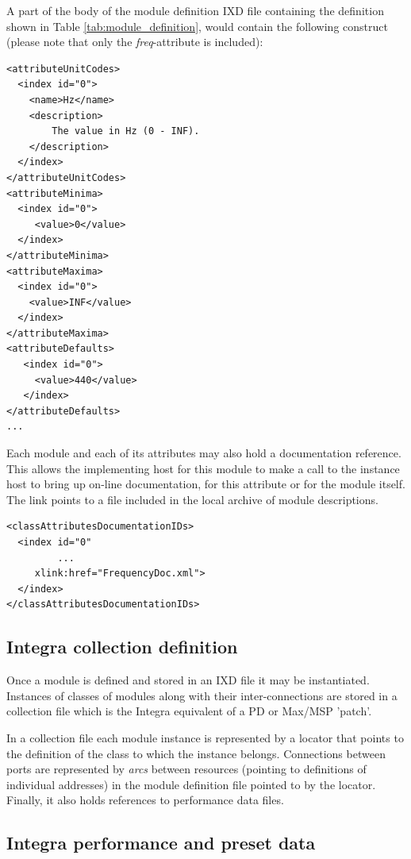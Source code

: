 \documentclass{article}
\begin{document}
A part of the body of the module definition IXD file containing the definition shown in Table \ref{tab:module_definition}, would contain the following construct (please note that only the \emph{freq}-attribute is included):

{\small
\begin{verbatim}
<attributeUnitCodes> 
  <index id="0">
    <name>Hz</name>
    <description>
        The value in Hz (0 - INF).
    </description>
  </index>
</attributeUnitCodes>
<attributeMinima> 
  <index id="0">
     <value>0</value>
  </index>
</attributeMinima>
<attributeMaxima> 
  <index id="0">
    <value>INF</value>
  </index>
</attributeMaxima>
<attributeDefaults>
   <index id="0">
     <value>440</value>
   </index>
</attributeDefaults>
...
\end{verbatim}
}

Each module and each of its attributes may also hold a documentation reference. This allows the implementing host for this module to make a call to the instance host to bring up on-line documentation, for this attribute or for the module itself. The link points to a file included in the local archive of module descriptions.

{\small
\begin{verbatim}
<classAttributesDocumentationIDs>
  <index id="0"
         ...
     xlink:href="FrequencyDoc.xml">
  </index>
</classAttributesDocumentationIDs>
\end{verbatim}
}

\subsection{Integra collection definition}\label{subsect:integra_collection_definition}

Once a module is defined and stored in an IXD file it may be instantiated. Instances of classes of modules along with their inter-connections are stored in a collection file which is the Integra equivalent of a PD or Max/MSP 'patch'.

In a collection file each module instance is represented by a locator that points to the definition of the class to which the instance belongs. Connections between ports are represented by \emph{arcs} between resources (pointing to definitions of individual addresses) in the module definition file pointed to by the locator. Finally, it also holds references to performance data files.

\subsection{Integra performance and preset data}\label{subsect:integra_preset_data}
\end{document}

